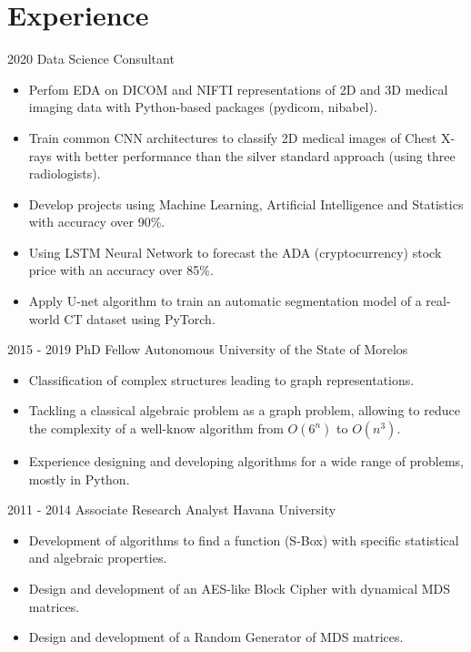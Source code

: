 \documentclass[]{friggeri-cv}
\begin{document}
\section{Experience}
\begin{entrylist}
    \entry
    {2020}
    {Data Science Consultant}
    {}
    {\vspace{-.1in}
\begin{itemize}
\item  Perfom EDA on  DICOM and NIFTI representations of 2D and 3D medical imaging data with  Python-based  packages (pydicom, nibabel).
\item Train common CNN architectures to classify 2D medical images of Chest X-rays with better performance than the silver standard approach (using three radiologists).
\item   Develop  projects using Machine Learning, Artificial Intelligence and Statistics with  accuracy over  90\%.
\item Using LSTM Neural Network to forecast the ADA (cryptocurrency) stock price with an accuracy over 85\%.
\item  Apply U-net algorithm to train an automatic segmentation
 model of a real-world CT dataset using PyTorch.
\end{itemize}    
   }
    \entry
    {2015 - 2019}
    {PhD Fellow}
    {Autonomous University of the State of Morelos}
    {\vspace{-.1in}
\begin{itemize}
  \item Classification of complex structures leading to graph representations.
\item Tackling a classical algebraic problem as a graph problem, allowing to reduce the complexity of a well-know algorithm from $O(6^n)$ to $O(n^3)$. 
\item  Experience designing and developing algorithms for a wide range of problems, mostly in Python.  
\end{itemize}    
   }
  \entry
    {2011 - 2014}
    { Associate Research Analyst}
    {Havana University}
    { \vspace{-.1in}
    \begin{itemize}
    \item  Development of algorithms  to find a function (S-Box) with specific statistical and algebraic properties.
    \item Design and development of an AES-like  Block Cipher with dynamical MDS matrices.
    \item Design and development of a Random Generator of MDS matrices.
    \end{itemize}
 } 
\end{entrylist}\vspace*{-0.1in}
\end{document}

